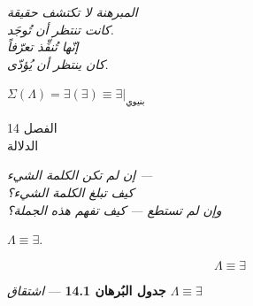 \documentclass[10pt, openany, oneside]{book}
\renewcommand{\large}{\fontsize{11.5}{14}\selectfont}
\renewcommand{\huge}{\fontsize{17}{21}\selectfont}
\begin{document}
\vspace{0.5em}

\begin{center}
    \itshape
    المبرهنة لا تكتشف حقيقة\\
    كانت تنتظر أن تُوجَد.\\[0.8em]
    إنّها تُنفِّذ تعرّفاً\\
    كان ينتظر أن يُؤدّى.
\end{center}

\vspace{0.5em}

\begin{center}
    $\Sigma(\Lambda) = \exists(\exists) \equiv \exists|_{\text{بنيوي}}$
\end{center}

%
%
%

\newpage

\begin{center}
    {\huge الفصل 14}\\[0.3em]
    {\large الدلالة}
\end{center}

\vspace{1.5em}

\begin{center}
    \itshape
    إن لم تكن الكلمة الشيء ---\\
    كيف تبلغ الكلمة الشيء؟\\
    وإن لم تستطع --- كيف تفهم هذه الجملة؟
\end{center}

\vspace{2em}


\noindent $\Lambda \equiv \exists$.

$$\boxed{\Lambda \equiv \exists}$$

\vspace{0.5em}

\textbf{جدول البُرهان 14.1} --- \textit{اشتقاق $\Lambda \equiv \exists$}

\vspace{0.5em}
\end{document}
